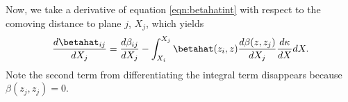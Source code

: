Now, we take a derivative of equation \ref{eqn:betahatint} with respect to the comoving distance to plane $j$, $X_j$, which yields
\begin{equation}
\frac{d \betahat_{i j}}{d X_j} = \frac{d\beta_{i j}}{d X_j} - \int_{X_i}^{X_j} \betahat(z_i, z) \frac{d \beta(z, z_j)}{d X_j} \frac{d \kappa}{d X} d X.
\end{equation}
Note the second term from differentiating the integral term disappears because $\beta(z_j, z_j) = 0$. 
  
  
  